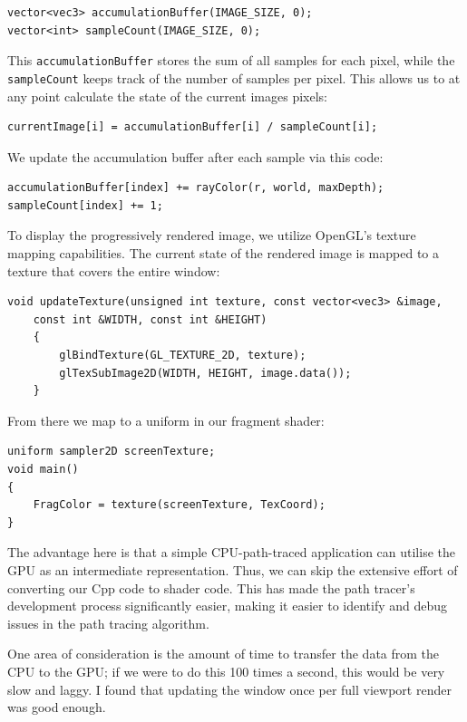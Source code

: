 \documentclass[12pt]{article}
\begin{document}
\begin{verbatim}
vector<vec3> accumulationBuffer(IMAGE_SIZE, 0);
vector<int> sampleCount(IMAGE_SIZE, 0);
\end{verbatim}

This \texttt{accumulationBuffer} stores the sum of all samples for each pixel, while the \texttt{sampleCount} keeps track of the number of samples per pixel. This allows us to at any point calculate the state of the current images pixels:
\begin{verbatim}
currentImage[i] = accumulationBuffer[i] / sampleCount[i];
\end{verbatim}

We update the accumulation buffer after each sample via this code:

\begin{verbatim}
accumulationBuffer[index] += rayColor(r, world, maxDepth);
sampleCount[index] += 1;
\end{verbatim}

To display the progressively rendered image, we utilize OpenGL's texture mapping capabilities.
The current state of the rendered image is mapped to a texture that covers the entire window:

\begin{verbatim}
void updateTexture(unsigned int texture, const vector<vec3> &image,
    const int &WIDTH, const int &HEIGHT)
    {
        glBindTexture(GL_TEXTURE_2D, texture);
        glTexSubImage2D(WIDTH, HEIGHT, image.data());
    }
\end{verbatim}

From there we map to a uniform in our fragment shader:

\begin{verbatim}
uniform sampler2D screenTexture;
void main()
{
    FragColor = texture(screenTexture, TexCoord);
}
\end{verbatim}

The advantage here is that a simple CPU-path-traced application can utilise the GPU as an intermediate representation. Thus, we can skip the extensive effort of converting our Cpp code to shader code. This has made the path tracer's development process significantly easier, making it easier to identify and debug issues in the path tracing algorithm.

One area of consideration is the amount of time to transfer the data from the CPU to the GPU; if we were to do this 100 times a second, this would be very slow and laggy. I found that updating the window once per full viewport render was good enough.
\end{document}
